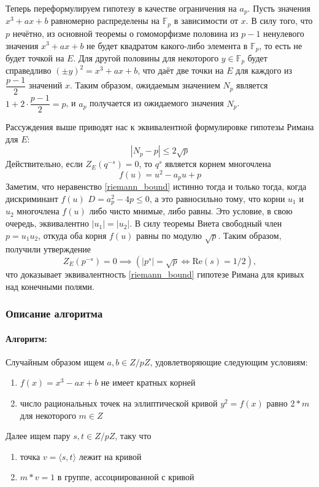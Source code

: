 \documentclass[12pt]{article}
\theoremstyle{definition}
\numberwithin{Def}{section}
\numberwithin{Th}{section}
\numberwithin{St}{section}
\numberwithin{Cor}{section}
\begin{document}
Теперь переформулируем гипотезу в качестве ограничения на $a_p$. Пусть
значения ${x^3+ax+b}$ равномерно распределены на $\mathbb{F}_p$ в зависимости от
$x$. В силу того, что $p$ нечётно, из основной теоремы о гомоморфизме половина
из $p-1$ ненулевого значения ${x^3+ax+b}$ не будет квадратом какого-либо
элемента в $\mathbb{F}_p$, то есть не будет точкой на $E$. Для другой
половины для некоторого $y\in\mathbb{F}_p$ будет справедливо
${(\pm y)^2=x^3+ax+b}$, что даёт две точки на $E$ для каждого из $\dfrac{p-1}2$
значений $x$. Таким образом, ожидаемым значением $N_p$ является
$1+2\cdot \dfrac{p-1}2=p$, и $a_p$ получается из ожидаемого значения $N_p$.

Рассуждения выше приводят нас к эквивалентной формулировке гипотезы Римана для
$E$:
\begin{equation}\label{riemann_bound}
	|N_p-p|\leqslant 2\sqrt{p}
\end{equation}
Действительно, если $Z_E(q^{-s})=0$, то $q^s$ является корнем многочлена
$$
f(u)=u^2-a_p u+p
$$
Заметим, что неравенство \eqref{riemann_bound} истинно тогда и только тогда,
когда дискриминант $f(u)$ $D=a^2_p-4p\leqslant 0$, а это равносильно тому, что
корни $u_1$ и $u_2$ многочлена $f(u)$ либо чисто мнимые, либо равны. Это условие,
в свою очередь, эквивалентно $|u_1|=|u_2|$. В силу теоремы Виета свободный член
$p=u_1u_2$, откуда оба корня $f(u)$ равны по модулю $\sqrt{p}$. Таким образом, 
получили утверждение
$$
Z_E(p^{-s})=0\implies(|p^s|=\sqrt{p}\iff \text{Re}(s)=1/2),
$$
что доказывает эквивалентность \eqref{riemann_bound} гипотезе Римана для кривых
над конечными полями.

\subsubsection{Описание алгоритма}

\paragraph{Алгоритм:} Случайным образом ищем $a,b\in Z/pZ$, удовлетворяющие
следующим условиям:
\begin{enumerate}[(1)]
	\item $f(x)=x^3-ax+b$ не имеет кратных корней
	\item число рациональных точек на эллиптической кривой $y^2=f(x)$ равно
	$2*m$ для некоторого $m\in Z$
\end{enumerate}
Далее ищем пару $s,t\in Z/pZ$, таку что
\begin{enumerate}[(1)]
	\item точка $v=\langle s,t\rangle$ лежит на кривой
	\item $m*v=1$ в группе, ассоциированной с кривой
\end{enumerate}
\end{document}
